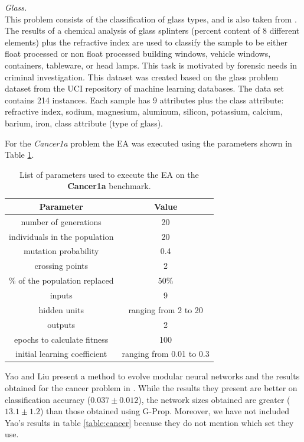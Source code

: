 \documentclass{llncs}
\begin{document}
\emph{Glass.} \\
This problem consists of the classification of glass types, and is also taken from \cite{Prechelt94c}. The results of a chemical analysis of glass splinters (percent content of 8 different elements) plus the refractive index are used to classify the sample to be either float processed or non float processed building windows, vehicle windows, containers, tableware, or head lamps. This task is motivated by forensic needs in criminal investigation.
This dataset was created based on the glass problem dataset from the UCI repository of machine learning databases.
The data set contains 214 instances. Each sample has 9 attributes plus the class attribute: refractive index, sodium, magnesium, aluminum, silicon, potassium, calcium, barium, iron, class attribute (type of glass).

For the \emph{Cancer1a} problem the EA was executed using the parameters shown in Table \ref{table:parametros}.
\begin{table}[!h]
\begin{center}
\begin{tabular}{|c|c|}
\hline 
Parameter & Value \\
\hline
\hline
number of generations & 20 \\
\hline
individuals in the population & 20 \\
\hline
mutation probability & 0.4 \\
\hline
crossing points & 2 \\
\hline
$\%$ of the population replaced & $50\%$ \\
\hline
inputs & 9 \\
\hline
hidden units & ranging from 2 to 20 \\
\hline
outputs & 2 \\
\hline
epochs to calculate fitness & 100 \\
\hline
initial learning coefficient & ranging from 0.01 to 0.3 \\
\hline
\end{tabular}
\end{center}
\caption{\small{List of parameters used to execute the EA on the \textbf{Cancer1a} benchmark.}}
\label{table:parametros}
\end{table}

Yao and Liu present a method to evolve modular neural networks and the results obtained for the cancer problem in \cite{Yao98b}. While the results they present are better on classification accuracy ($0.037 \pm 0.012$), the network sizes obtained are greater ($13.1 \pm 1.2$) than those obtained using G-Prop. Moreover, we have not included Yao's results in table \ref{table:cancer} because they do not mention which set they use.
\end{document}
